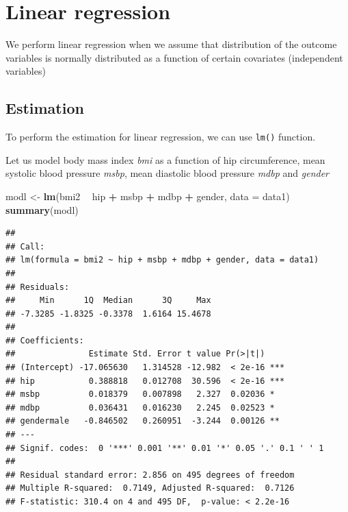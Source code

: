 \documentclass[]{book}
\newenvironment{Shaded}{\begin{snugshade}}{\end{snugshade}}
\newcommand{\KeywordTok}[1]{\textcolor[rgb]{0.13,0.29,0.53}{\textbf{#1}}}
\newcommand{\DataTypeTok}[1]{\textcolor[rgb]{0.13,0.29,0.53}{#1}}
\newcommand{\StringTok}[1]{\textcolor[rgb]{0.31,0.60,0.02}{#1}}
\newcommand{\OperatorTok}[1]{\textcolor[rgb]{0.81,0.36,0.00}{\textbf{#1}}}
\newcommand{\NormalTok}[1]{#1}
\theoremstyle{definition}
\theoremstyle{definition}
\theoremstyle{remark}
\begin{document}
\section{Linear regression}\label{linear-regression}

We perform linear regression when we assume that distribution of the
outcome variables is normally distributed as a function of certain
covariates (independent variables)

\subsection{Estimation}\label{estimation}

To perform the estimation for linear regression, we can use
\texttt{lm()} function.

Let us model body mass index \emph{bmi} as a function of hip
circumference, mean systolic blood pressure \emph{msbp}, mean diastolic
blood pressure \emph{mdbp} and \emph{gender}

\begin{Shaded}
\begin{Highlighting}[]
\NormalTok{modl <-}\StringTok{ }\KeywordTok{lm}\NormalTok{(bmi2 }\OperatorTok{~}\StringTok{ }\NormalTok{hip }\OperatorTok{+}\StringTok{ }\NormalTok{msbp }\OperatorTok{+}\StringTok{ }\NormalTok{mdbp }
           \OperatorTok{+}\StringTok{ }\NormalTok{gender, }\DataTypeTok{data =}\NormalTok{ data1)}
\KeywordTok{summary}\NormalTok{(modl)}
\end{Highlighting}
\end{Shaded}

\begin{verbatim}
## 
## Call:
## lm(formula = bmi2 ~ hip + msbp + mdbp + gender, data = data1)
## 
## Residuals:
##     Min      1Q  Median      3Q     Max 
## -7.3285 -1.8325 -0.3378  1.6164 15.4678 
## 
## Coefficients:
##               Estimate Std. Error t value Pr(>|t|)    
## (Intercept) -17.065630   1.314528 -12.982  < 2e-16 ***
## hip           0.388818   0.012708  30.596  < 2e-16 ***
## msbp          0.018379   0.007898   2.327  0.02036 *  
## mdbp          0.036431   0.016230   2.245  0.02523 *  
## gendermale   -0.846502   0.260951  -3.244  0.00126 ** 
## ---
## Signif. codes:  0 '***' 0.001 '**' 0.01 '*' 0.05 '.' 0.1 ' ' 1
## 
## Residual standard error: 2.856 on 495 degrees of freedom
## Multiple R-squared:  0.7149, Adjusted R-squared:  0.7126 
## F-statistic: 310.4 on 4 and 495 DF,  p-value: < 2.2e-16
\end{verbatim}
\end{document}
